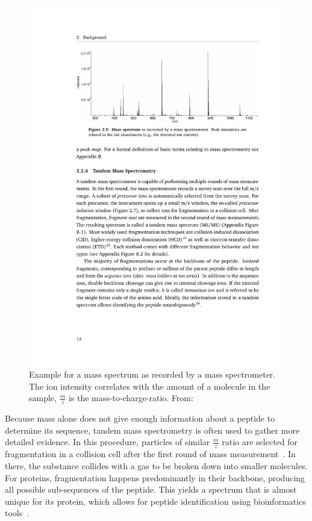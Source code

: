	\begin{figure}
		\normalsize
		\centering
		\includegraphics[width = \textwidth, trim=3.9cm 20cm 2.5cm 3cm,clip]{figures/Grafik_Timo.pdf}
		\caption[Example for a mass spectrum]{Example for a mass spectrum as recorded by a mass spectrometer. The ion intensity correlates with the amount of a molecule in the sample, $\frac{m}{z}$ is the mass-to-charge-ratio. From:~\citet{Sachsenberg2017}}
		\label{fig:mass_spectrum}
	\end{figure}
	\renewcommand{\baselinestretch}{1}
	Because mass alone does not give enough information about a peptide to determine its sequence, tandem mass spectrometry is often used to gather more detailed evidence. In this procedure, particles of similar $\frac{m}{z}$ ratio are selected for fragmentation in a collision cell after the first round of mass measurement~\cite{Sachsenberg2017}. In there, the substance collides with a gas to be broken down into smaller molecules. For proteins, fragmentation happens predominantly in their backbone, producing all possible sub-sequences of the peptide. This yields a spectrum that is almost unique for its protein, which allows for peptide identification using bioinformatics tools~\cite{Angel2012}.\\
